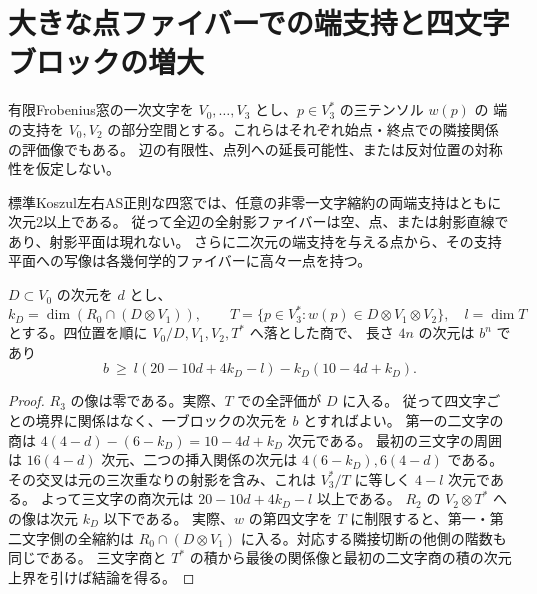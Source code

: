 \section{大きな点ファイバーでの端支持と四文字ブロックの増大}
\label{sec:endpoint-plane-growth}
有限Frobenius窓の一次文字を $V_0,\ldots,V_3$ とし、$p\in V_3^*$ の三テンソル $w(p)$ の
端の支持を $V_0,V_2$ の部分空間とする。これらはそれぞれ始点・終点での隣接関係の評価像でもある。
辺の有限性、点列への延長可能性、または反対位置の対称性を仮定しない。
\begin{theorem}\label{thm:all-endpoint-ranks-two}
標準Koszul左右AS正則な四窓では、任意の非零一文字縮約の両端支持はともに次元2以上である。
従って全辺の全射影ファイバーは空、点、または射影直線であり、射影平面は現れない。
さらに二次元の端支持を与える点から、その支持平面への写像は各幾何学的ファイバーに高々一点を持つ。
\end{theorem}
\begin{lemma}\label{lem:rectangular-four-block}
$D\subset V_0$ の次元を $d$ とし、
\[
 k_D=\dim(R_0\cap(D\otimes V_1)),\qquad
 T=\{p\in V_3^*:w(p)\in D\otimes V_1\otimes V_2\},\quad l=\dim T
\]
とする。四位置を順に $V_0/D,V_1,V_2,T^*$ へ落とした商で、
長さ $4n$ の次元は $b^n$ であり
\[
 b\ \ge\ l(20-10d+4k_D-l)-k_D(10-4d+k_D).
\]
\end{lemma}
\begin{proof}
$R_3$ の像は零である。実際、$T$ での全評価が $D$ に入る。
従って四文字ごとの境界に関係はなく、一ブロックの次元を $b$ とすればよい。
第一の二文字の商は $4(4-d)-(6-k_D)=10-4d+k_D$ 次元である。
最初の三文字の周囲は $16(4-d)$ 次元、二つの挿入関係の次元は $4(6-k_D),6(4-d)$ である。
その交叉は元の三次重なりの射影を含み、これは $V_3^*/T$ に等しく $4-l$ 次元である。
よって三文字の商次元は $20-10d+4k_D-l$ 以上である。
$R_2$ の $V_2\otimes T^*$ への像は次元 $k_D$ 以下である。
実際、$w$ の第四文字を $T$ に制限すると、第一・第二文字側の全縮約は
$R_0\cap(D\otimes V_1)$ に入る。対応する隣接切断の他側の階数も同じである。
三文字商と $T^*$ の積から最後の関係像と最初の二文字商の積の次元上界を引けば結論を得る。
\end{proof}

